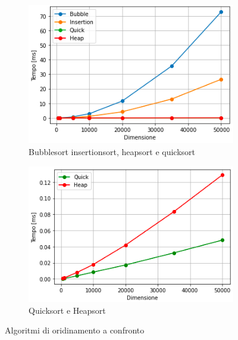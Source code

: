 \documentclass[12pt,a4paper]{report}
\begin{document}
\begin{figure}[ht]
     \centering
     \begin{subfigure}[t]{0.45\textwidth}
         \centering
         \includegraphics[width=\textwidth]{Img/GraficiSorting/Sorting1.png}
         \caption{Bubblesort insertionsort, heapsort e quicksort}
         \label{Fig:AllSortingAlg}
     \end{subfigure}
     \hfill
     \begin{subfigure}[t]{0.45\textwidth}
         \centering
         \includegraphics[width=\textwidth]{Img/GraficiSorting/Sorting2.png}
         \caption{Quicksort e Heapsort}
         \label{Fig:QHSort}
     \end{subfigure}

   \caption{Algoritmi di oridinamento a confronto}
   \label{Fig:AllSort}
\end{figure}
\end{document}
